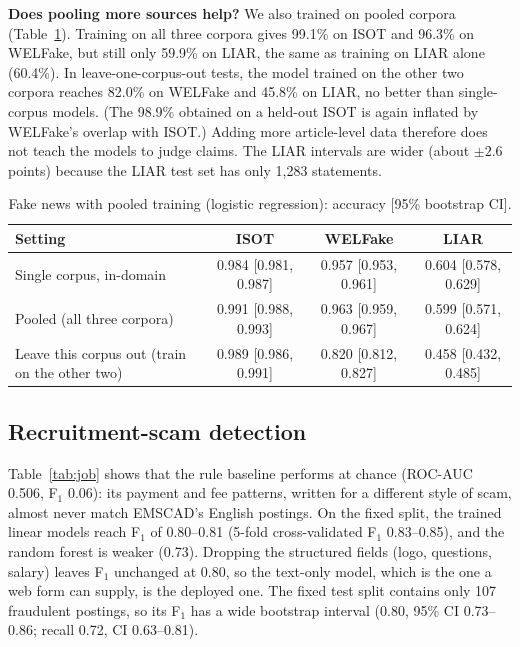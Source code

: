 \documentclass[11pt,a4paper]{article}
\begin{document}
\textbf{Does pooling more sources help?} We also trained on pooled corpora (Table~\ref{tab:pool}). Training on all three corpora gives 99.1\% on ISOT and 96.3\% on WELFake, but still only 59.9\% on LIAR, the same as training on LIAR alone (60.4\%). In leave-one-corpus-out tests, the model trained on the other two corpora reaches 82.0\% on WELFake and 45.8\% on LIAR, no better than single-corpus models. (The 98.9\% obtained on a held-out ISOT is again inflated by WELFake's overlap with ISOT.) Adding more article-level data therefore does not teach the models to judge claims. The LIAR intervals are wider (about $\pm2.6$ points) because the LIAR test set has only 1{,}283 statements.

\begin{table}[h]
\centering
\caption{Fake news with pooled training (logistic regression): accuracy [95\% bootstrap CI].}\label{tab:pool}
\small
\begin{tabular}{lccc}
\toprule
Setting & ISOT & WELFake & LIAR \\
\midrule
Single corpus, in-domain & 0.984 [0.981, 0.987] & 0.957 [0.953, 0.961] & 0.604 [0.578, 0.629] \\
Pooled (all three corpora) & 0.991 [0.988, 0.993] & 0.963 [0.959, 0.967] & 0.599 [0.571, 0.624] \\
Leave this corpus out (train on the other two) & 0.989 [0.986, 0.991] & 0.820 [0.812, 0.827] & 0.458 [0.432, 0.485] \\
\bottomrule
\end{tabular}
\end{table}

\subsection{Recruitment-scam detection}
Table~\ref{tab:job} shows that the rule baseline performs at chance (ROC-AUC 0.506, F$_1$ 0.06): its payment and fee patterns, written for a different style of scam, almost never match EMSCAD's English postings. On the fixed split, the trained linear models reach F$_1$ of 0.80--0.81 (5-fold cross-validated F$_1$ 0.83--0.85), and the random forest is weaker (0.73). Dropping the structured fields (logo, questions, salary) leaves F$_1$ unchanged at 0.80, so the text-only model, which is the one a web form can supply, is the deployed one. The fixed test split contains only 107 fraudulent postings, so its F$_1$ has a wide bootstrap interval (0.80, 95\% CI 0.73--0.86; recall 0.72, CI 0.63--0.81).
\end{document}
